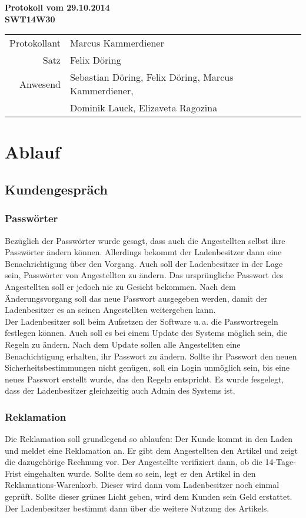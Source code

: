 \documentclass{scrartcl}
\begin{document}
\begin{center}
\LARGE \bf{Protokoll vom 29.10.2014 \\
SWT14W30}
\end{center}

\begin{tabular}{rp{10cm}}
Protokollant & Marcus Kammerdiener \\
Satz & Felix Döring \\
Anwesend & Sebastian Döring, Felix Döring, Marcus Kammerdiener,\\
& Dominik Lauck, Elizaveta Ragozina \\
\end{tabular}

\vspace*{3em}

\section{Ablauf}
\subsection{Kundengespr\"ach}
\subsubsection{Passw\"orter}
Bezüglich der Passwörter wurde gesagt, dass auch die Angestellten selbst ihre Passwörter ändern können. Allerdings
bekommt der Ladenbesitzer dann eine Benachrichtigung über den Vorgang. Auch soll der Ladenbesitzer in der Lage sein, Passwörter von Angestellten zu ändern. Das ursprüngliche Passwort des Angestellten soll er jedoch nie zu Gesicht bekommen. Nach dem Änderungsvorgang soll das neue Passwort ausgegeben werden, damit der Ladenbesitzer es an seinen Angestellten weitergeben kann.\\
Der Ladenbesitzer soll beim Aufsetzen der Software u.\,a. die Passwortregeln festlegen können. Auch soll es bei einem
Update des Systems möglich sein, die Regeln zu ändern. Nach dem Update sollen alle Angestellten eine Benachichtigung erhalten, ihr Passwort zu ändern. Sollte ihr Passwort den neuen Sicherheitsbestimmungen nicht genügen, soll ein Login unmöglich sein, bis eine neues Passwort erstellt wurde, das den Regeln entspricht. Es wurde fesgelegt, dass der Ladenbesitzer gleichzeitig auch Admin des Systems ist.
\subsubsection{Reklamation}
Die Reklamation soll grundlegend so ablaufen: Der Kunde kommt in den Laden und meldet eine Reklamation an. Er gibt
dem Angestellten den Artikel und zeigt die dazugehörige Rechnung vor. Der Angestellte verifiziert dann, ob die
14-Tage-Frist eingehalten wurde. Sollte dem so sein, legt er den Artikel in den Reklamations-Warenkorb. Dieser 
wird dann vom Ladenbesitzer noch einmal geprüft. Sollte dieser grünes Licht geben, wird dem Kunden sein Geld 
erstattet. Der Ladenbesitzer bestimmt dann über die weitere Nutzung des Artikels.
\end{document}
